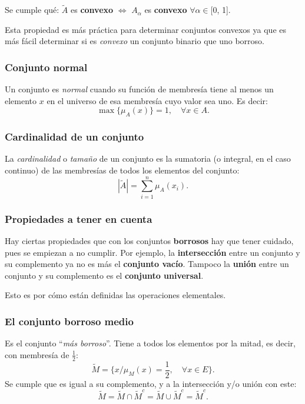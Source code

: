 \documentclass[10pt,a4paper]{article}
\begin{document}
Se cumple qué: $\tilde{A}$ es \textbf{convexo} $\iff$ $A_\alpha$ es \textbf{convexo} $\forall \alpha \in $[0, 1].

Esta propiedad es más práctica para determinar conjuntos convexos ya que es más fácil determinar si es \textit{convexo} un conjunto binario que uno borroso.

\begin{multicols}{2}

\subsubsection{Conjunto normal}

Un conjunto es \textit{normal} cuando su función de membresía tiene al menos un elemento $x$ en el universo de esa membresía cuyo valor sea uno. Es decir:
\[
\max\{\mu_A(x)\}=1, \quad \forall x \in A.
\]

\columnbreak

\subsubsection{Cardinalidad de un conjunto}

La \textit{cardinalidad} o \textit{tamaño} de un conjunto es la sumatoria (o integral, en el caso continuo) de las membresías de todos los elementos del conjunto:
\[
|\tilde{A}|=\sum_{i=1}^n \mu_A(x_i).
\]

\end{multicols}

\subsubsection{Propiedades a tener en cuenta}

Hay ciertas propiedades que con los conjuntos \textbf{borrosos} hay que tener cuidado, pues se empiezan a no cumplir. Por ejemplo, la \textbf{intersección} entre un conjunto y su complemento ya no es más el \textbf{conjunto vacío}. Tampoco la \textbf{unión} entre un conjunto y su complemento es el \textbf{conjunto universal}.

Esto es por cómo están definidas las operaciones elementales.

\subsubsection{El conjunto borroso medio}

Es el conjunto ``\textit{más borroso}''. Tiene a todos los elementos por la mitad, es decir, con membresía de $\frac{1}{2}$:
\[
\tilde{M} =\{x/\mu_M(x)= \frac{1}{2}, \quad \forall x \in E\}.
\]
Se cumple que es igual a su complemento, y a la intersección y/o unión con este:
\[
\tilde{M} = \tilde{M} \cap \tilde{M}^c = \tilde{M} \cup \tilde{M}^c = \tilde{M}^c.
\]
\end{document}
